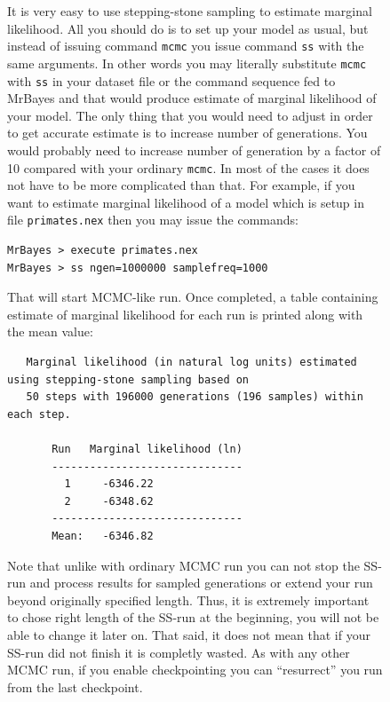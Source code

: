 \documentclass[12pt]{book}
\newcommand{\ttt}[1]{\texttt{#1}}
\begin{document}
\begin{figure}[h]
It is very easy to use stepping-stone sampling to estimate marginal likelihood. All you should do
is to set up your model as usual, but instead of issuing command \ttt{mcmc} you issue command
\ttt{ss} with the same arguments. In other words you may literally substitute \ttt{mcmc} with
\ttt{ss} in your dataset file or the command sequence fed to MrBayes and that would produce
estimate of marginal likelihood of your model. The only thing that you would need to adjust in
order to get accurate estimate is to increase number of generations. You would probably need to
increase number of generation by a factor of 10 compared with your ordinary \ttt{mcmc}. In most of
the cases it does not have to be more complicated than that. For example, if you want to estimate
marginal likelihood of a model which is setup in file \ttt{primates.nex} then you may issue the
commands:

\small
\begin{singlespacing}
\begin{verbatim}
MrBayes > execute primates.nex
MrBayes > ss ngen=1000000 samplefreq=1000
\end{verbatim}
\end{singlespacing}
\normalsize

That will start MCMC-like run. Once completed, a table containing estimate of marginal likelihood
for each run is printed along with the mean value:

\begin{singlespacing}
\scriptsize
\begin{verbatim}
   Marginal likelihood (in natural log units) estimated using stepping-stone sampling based on
   50 steps with 196000 generations (196 samples) within each step.

       Run   Marginal likelihood (ln)
       ------------------------------
         1     -6346.22
         2     -6348.62
       ------------------------------
       Mean:   -6346.82
\end{verbatim}
\normalsize
\end{singlespacing}

Note that unlike with ordinary MCMC run you can not stop the SS-run and process results for sampled
generations or extend your run beyond originally specified length. Thus, it is extremely important
to chose right length of the SS-run at the beginning, you will not be able to change it later on.
That said, it does not mean that if your SS-run did not finish it is completly wasted. As with any
other MCMC run, if you enable checkpointing you can ``resurrect'' you run from the last checkpoint.


\end{figure}
\end{document}
